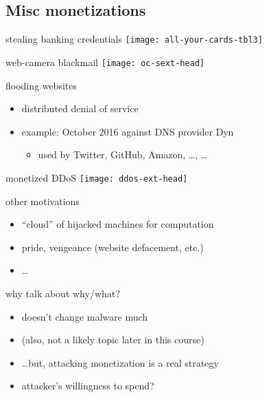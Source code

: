 \subsection{Misc monetizations}

\begin{frame}{stealing banking credentials}
\texttt{[image: all-your-cards-tbl3]}
\end{frame}

\begin{frame}{web-camera blackmail}
\texttt{[image: oc-sext-head]}
\end{frame}

\begin{frame}{flooding websites}
    \begin{itemize}
    \item distributed denial of service
    \item example: October 2016 against DNS provider Dyn
        \begin{itemize}
        \item used by Twitter, GitHub, Amazon, \ldots, \ldots
        \end{itemize}
    \end{itemize}
\end{frame}

\begin{frame}{monetized DDoS}
    \texttt{[image: ddos-ext-head]}  
\end{frame}

\begin{frame}{other motivations}
    \begin{itemize}
    \item ``cloud'' of hijacked machines for computation
    \item pride, vengeance (website defacement, etc.)
    \item \ldots
    \end{itemize}
\end{frame}

\begin{frame}{why talk about why/what?}
    \begin{itemize}
    \item doesn't change malware much
    \item (also, not a likely topic later in this course)
    \item \ldots but, attacking monetization is a real strategy
    \item attacker's willingness to spend?
    \end{itemize}
\end{frame}

